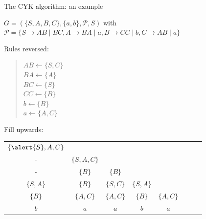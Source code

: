\documentclass[handout]{beamer}
\begin{document}
\begin{frame}{The CYK algorithm: an example}

	\begin{example}
	$G=(\{S,A,B,C\},\{a,b\},\mathcal P,S)$ with $\mathcal P=\{S\to AB\mid BC, A\to BA\mid a, B\to CC\mid b, C\to AB\mid a\}$
	\end{example}
	\vspace{-6pt}
	Rules reversed:\vspace{-6pt}
	\begin{quote}
		\begin{multicols}{4}\small
			$AB  \leftarrow  \{S,C\}$\\
			$BA  \leftarrow  \{A\}$\\
			$BC  \leftarrow  \{S\}$\\
			$CC  \leftarrow  \{B\}$\\
			$b   \leftarrow  \{B\}$\\
			$a   \leftarrow  \{A,C\}$
		\end{multicols}	
	\end{quote}

	\vspace{-12pt}
	Fill upwards:
	\vspace{3pt}

	\begin{center}
		\begin{tabular}{|c c c c c c c c}
			$\{\alert{S},A,C\}$ \\ 
			- &  $\{S,A,C\}$  \\ 
			- &  $\{B\}$ &  $\{B\}$ \\ 
			$\{S,A\}$ &  $\{B\}$ & $\{S,C\}$ &  $\{S,A\}$ \\ 
			$\{B\}$ & $\{A,C\}$ &  $\{A,C\}$ &$\{B\}$ &$\{A,C\}$ \\ %
			\rowcolor{Gray}$b$&$a$&$a$&$b$&$a$
		\end{tabular}
	\end{center}

\end{frame}
\end{document}
